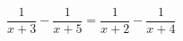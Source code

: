 \begin{ex}[type=equation]
	\begin{condition}
		$\dfrac{1}{x + 3} - \dfrac{1}{x + 5} = \dfrac{1}{x + 2} - \dfrac{1}{x + 4}$
	\end{condition}
\end{ex}